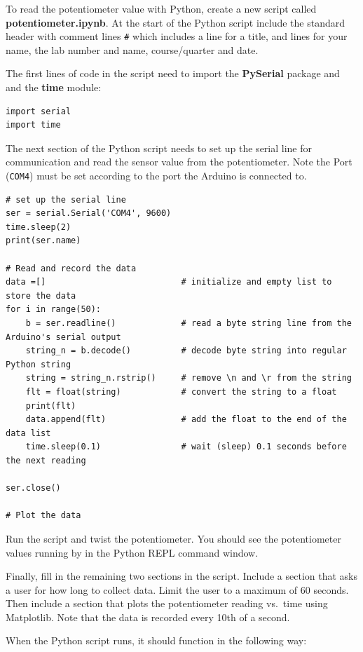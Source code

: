 \documentclass[11pt]{article}
\begin{document}
To read the potentiometer value with Python, create a new script called
\textbf{potentiometer.ipynb}. At the start of the Python script include
the standard header with comment lines \texttt{\#} which includes a line
for a title, and lines for your name, the lab number and name,
course/quarter and date.

The first lines of code in the script need to import the
\textbf{PySerial} package and and the \textbf{time} module:

\begin{verbatim}
import serial
import time
\end{verbatim}

The next section of the Python script needs to set up the serial line
for communication and read the sensor value from the potentiometer. Note
the Port (\texttt{\textquotesingle{}COM4\textquotesingle{}}) must be set
according to the port the Arduino is connected to.

\begin{verbatim}
# set up the serial line
ser = serial.Serial('COM4', 9600)
time.sleep(2)
print(ser.name)

# Read and record the data
data =[]                           # initialize and empty list to store the data
for i in range(50):
    b = ser.readline()             # read a byte string line from the Arduino's serial output
    string_n = b.decode()          # decode byte string into regular Python string
    string = string_n.rstrip()     # remove \n and \r from the string
    flt = float(string)            # convert the string to a float
    print(flt)
    data.append(flt)               # add the float to the end of the data list
    time.sleep(0.1)                # wait (sleep) 0.1 seconds before the next reading

ser.close()

# Plot the data
\end{verbatim}

Run the script and twist the potentiometer. You should see the
potentiometer values running by in the Python REPL command window.

Finally, fill in the remaining two sections in the script. Include a
section that asks a user for how long to collect data. Limit the user to
a maximum of 60 seconds. Then include a section that plots the
potentiometer reading vs.~time using Matplotlib. Note that the data is
recorded every 10th of a second.

When the Python script runs, it should function in the following way:
\end{document}

